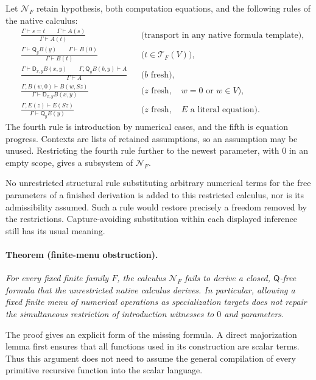 Let $\mathcal N_F$ retain hypothesis, both computation equations, and the
following rules of the native calculus:
\begin{align*}
 &\frac{\Gamma\vdash s=t\qquad\Gamma\vdash A(s)}
        {\Gamma\vdash A(t)}
       &&\text{(transport in any native formula template)},\\[2mm]
 &\frac{\Gamma\vdash\mathsf Q_y B(y)\qquad\Gamma\vdash B(0)}
        {\Gamma\vdash B(t)}
       &&\bigl(t\in\mathcal T_F(V)\bigr),\\[2mm]
 &\frac{\Gamma\vdash\mathsf D_{x,y}B(x,y)
        \qquad\Gamma,\mathsf Q_yB(b,y)\vdash A}
        {\Gamma\vdash A}
       &&\bigl(b\text{ fresh}\bigr),\\[2mm]
 &\frac{\Gamma,B(w,0)\vdash B(w,Sz)}
        {\Gamma\vdash\mathsf D_{x,y}B(x,y)}
       &&\bigl(z\text{ fresh},\quad w=0\text{ or }w\in V\bigr),\\[2mm]
 &\frac{\Gamma,E(z)\vdash E(Sz)}
        {\Gamma\vdash\mathsf Q_yE(y)}
       &&\bigl(z\text{ fresh},\quad E\text{ a literal equation}\bigr).
\end{align*}
The fourth rule is introduction by numerical cases, and the fifth is
equation progress.  Contexts are lists of retained assumptions, so an
assumption may be unused.  Restricting the fourth rule further to the
newest parameter, with $0$ in an empty scope, gives a subsystem of
$\mathcal N_F$.

No unrestricted structural rule substituting arbitrary numerical terms
for the free parameters of a finished derivation is added to this
restricted calculus, nor is its admissibility assumed. Such a rule would
restore precisely a freedom removed by the restrictions. Capture-avoiding
substitution within each displayed inference still has its usual meaning.

\paragraph{Theorem (finite-menu obstruction).}
\emph{For every fixed finite family $F$, the calculus $\mathcal N_F$ fails
to derive a closed, $\mathsf Q$-free formula that the unrestricted native
calculus derives.  In particular, allowing a fixed finite menu of numerical
operations as specialization targets does not repair the simultaneous
restriction of introduction witnesses to $0$ and parameters.}

The proof gives an explicit form of the missing formula.  A direct
majorization lemma first ensures that all functions used in its construction
are scalar terms.  Thus this argument does not need to assume the general
compilation of every primitive recursive function into the scalar language.

